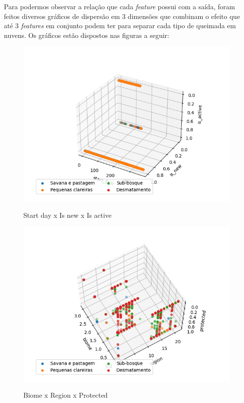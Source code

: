 Para podermos observar a relação que cada \textit{feature} possui com a saída, foram feitos diversos gráficos de dispersão em 3 dimensões que combinam o efeito que até 3 \textit{features} em conjunto podem ter para separar cada tipo de queimada em nuvens. Os gráficos estão dispostos nas figuras a seguir:


\begin{multicols}{2}

\begin{figure}[H]
    \caption{Start day x Is new x Is active}
     
    \centering 
    \includegraphics[width=0.9\linewidth]{tg1/figuras/start_DOYxis_newxis_active--150--120.png}
    \label{figura:six}
\end{figure}

\begin{figure}[H]
    \caption{Biome x Region x Protected}
     
    \centering 
    \includegraphics[width=1.1\linewidth]{tg1/figuras/biomexregionxprotected--120-30.png}
    \label{figura:one}
\end{figure}
        

\end{multicols}
